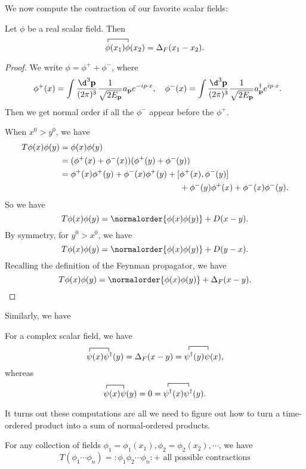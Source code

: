 \documentclass[a4paper]{article}
\begin{document}
We now compute the contraction of our favorite scalar fields:
\begin{prop}
  Let $\phi$ be a real scalar field. Then
  \[
    \contraction{}{\phi}{(x_1)}{\phi}\phi(x_1)\phi(x_2) = \Delta_F(x_1 - x_2).
  \]
\end{prop}

\begin{proof}
  We write $\phi = \phi^+ + \phi^-$, where
  \[
    \phi^+(x) = \int \frac{\d^3 \mathbf{p}}{(2\pi)^3} \frac{1}{\sqrt{2 E_\mathbf{p}}} a_\mathbf{p} e^{-ip\cdot x},\quad \phi^-(x) = \int \frac{\d^3 \mathbf{p}}{(2\pi)^3} \frac{1}{\sqrt{2 E_\mathbf{p}}} a_\mathbf{p}^\dagger e^{ip\cdot x}.
  \]
  Then we get normal order if all the $\phi^-$ appear before the $\phi^+$.

  When $x^0 > y^0$, we have
  \begin{align*}
    T\phi(x) \phi(y) ={}& \phi(x) \phi(y)\\
    ={}& (\phi^+(x) + \phi^-(x))(\phi^+(y) + \phi^-(y))\\
    ={}& \phi^+(x)\phi^+(y) + \phi^-(x) \phi^+(y) + [\phi^+(x), \phi^-(y)] \\
    &\hphantom{\phi^+(x)\phi^+(y) + \phi^-(x) \phi^+(y) + [}+ \phi^-(y) \phi^+(x) + \phi^-(x) \phi^-(y).
  \end{align*}
  So we have
  \[
    T\phi(x) \phi(y) = \normalorder{\phi(x) \phi(y)} + D(x - y).
  \]
  By symmetry, for $y^0 > x^0$, we have
  \[
    T\phi(x) \phi(y) = \normalorder{\phi(x)\phi(y)} + D(y - x).
  \]
  Recalling the definition of the Feynman propagator, we have
  \[
    T\phi(x)\phi(y) = \normalorder{\phi(x) \phi(y)} + \Delta_F(x - y). \qedhere
  \]
\end{proof}

Similarly, we have
\begin{prop}
   For a complex scalar field, we have
  \[
    \contraction{}{\psi}{(x)}{\psi^\dagger}\psi(x) \psi^\dagger(y) = \Delta_F(x - y) = \contraction{}{\psi^\dagger}{(u)}{\psi}\psi^\dagger(y) \psi(x),
  \]
  whereas
  \[
    \contraction{}{\psi}{(x)}{\psi} \psi(x) \psi(y) = 0 =\contraction{}{\psi^\dagger}{(x)}{\psi^\dagger} \psi^\dagger(x) \psi^\dagger(y).
  \]
\end{prop}

It turns out these computations are all we need to figure out how to turn a time-ordered product into a sum of normal-ordered products.

\begin{thm}
  For any collection of fields $\phi_1 = \phi_1(x_1), \phi_2 = \phi_2(x_2), \cdots$, we have
  \[
    T(\phi_1 \cdots \phi_n) = :\phi_1 \phi_2 \cdots \phi_n: + \text{ all possible contractions}
  \]
\end{thm}
\end{document}
